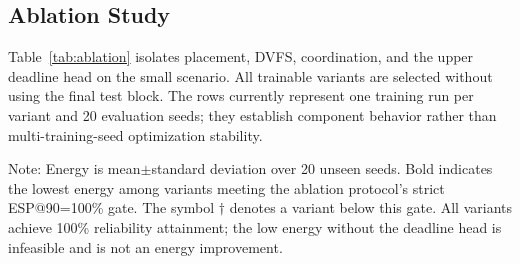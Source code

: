 \documentclass[lettersize,journal]{IEEEtran}
\begin{document}
\subsection{Ablation Study}
Table~\ref{tab:ablation} isolates placement, DVFS, coordination, and the upper
deadline head on the small scenario. All trainable variants are selected without
using the final test block. The rows currently represent one training run per
variant and 20 evaluation seeds; they establish component behavior rather than
multi-training-seed optimization stability.

\begin{table}[t]
\centering
\caption{Ablation results in the small workflow scenario.}
\label{tab:ablation}
\renewcommand{\arraystretch}{1.07}
\setlength{\tabcolsep}{6pt}
\vspace{1mm}
\parbox{0.98\textwidth}{\footnotesize
Note: Energy is mean$\pm$standard deviation over 20 unseen seeds. Bold indicates
the lowest energy among variants meeting the ablation protocol's strict
ESP@90=100\% gate. The symbol $\dagger$ denotes a variant below this gate. All
variants achieve 100\% reliability attainment; the low energy without the
deadline head is infeasible and is not an energy improvement.}
\end{table}
\end{document}
